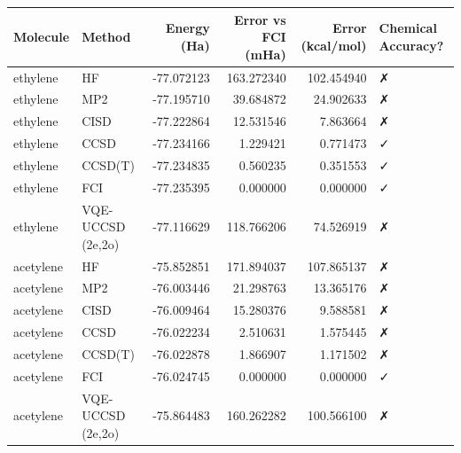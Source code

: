 \begin{tabular}{llrrrl}
\toprule
Molecule & Method & Energy (Ha) & Error vs FCI (mHa) & Error (kcal/mol) & Chemical Accuracy? \\
\midrule
ethylene & HF & -77.072123 & 163.272340 & 102.454940 & ✗ \\
ethylene & MP2 & -77.195710 & 39.684872 & 24.902633 & ✗ \\
ethylene & CISD & -77.222864 & 12.531546 & 7.863664 & ✗ \\
ethylene & CCSD & -77.234166 & 1.229421 & 0.771473 & ✓ \\
ethylene & CCSD(T) & -77.234835 & 0.560235 & 0.351553 & ✓ \\
ethylene & FCI & -77.235395 & 0.000000 & 0.000000 & ✓ \\
ethylene & VQE-UCCSD (2e,2o) & -77.116629 & 118.766206 & 74.526919 & ✗ \\
acetylene & HF & -75.852851 & 171.894037 & 107.865137 & ✗ \\
acetylene & MP2 & -76.003446 & 21.298763 & 13.365176 & ✗ \\
acetylene & CISD & -76.009464 & 15.280376 & 9.588581 & ✗ \\
acetylene & CCSD & -76.022234 & 2.510631 & 1.575445 & ✗ \\
acetylene & CCSD(T) & -76.022878 & 1.866907 & 1.171502 & ✗ \\
acetylene & FCI & -76.024745 & 0.000000 & 0.000000 & ✓ \\
acetylene & VQE-UCCSD (2e,2o) & -75.864483 & 160.262282 & 100.566100 & ✗ \\
\bottomrule
\end{tabular}

